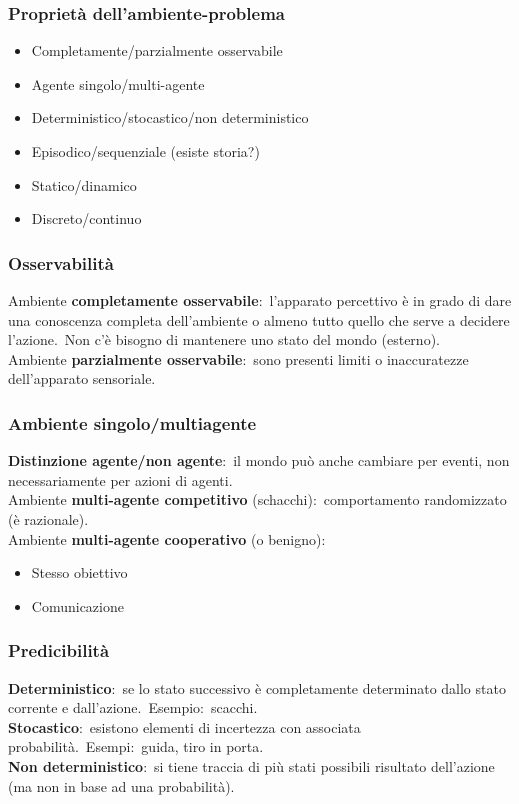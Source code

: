 \subsubsection{Proprietà dell'ambiente-problema}
\begin{itemize}
	\item Completamente/parzialmente osservabile
	\item Agente singolo/multi-agente
	\item Deterministico/stocastico/non deterministico
	\item Episodico/sequenziale (esiste storia?)
	\item Statico/dinamico
	\item Discreto/continuo
\end{itemize}

\subsubsection{Osservabilità}

Ambiente \textbf{completamente osservabile}:\ l'apparato percettivo è in grado di dare una conoscenza completa dell'ambiente o almeno tutto quello che serve a decidere l'azione.\
Non c'è bisogno di mantenere uno stato del mondo (esterno).\\
Ambiente \textbf{parzialmente osservabile}:\ sono presenti limiti o inaccuratezze dell'apparato sensoriale.

\subsubsection{Ambiente singolo/multiagente}
\textbf{Distinzione agente/non agente}:\ il mondo può anche cambiare per eventi, non necessariamente per azioni di agenti.\\
Ambiente \textbf{multi-agente competitivo} (schacchi):\ comportamento randomizzato (è razionale).\\
Ambiente \textbf{multi-agente cooperativo} (o benigno):
\begin{itemize}
	\item Stesso obiettivo
	\item Comunicazione
\end{itemize}

\subsubsection{Predicibilità}
\textbf{Deterministico}:\ se lo stato successivo è completamente determinato dallo stato corrente e dall'azione.\
Esempio:\ scacchi.\\
\textbf{Stocastico}:\ esistono elementi di incertezza con associata probabilità.\
Esempi:\ guida, tiro in porta.\\
\textbf{Non deterministico}:\ si tiene traccia di più stati possibili risultato dell'azione (ma non in base ad una probabilità).


